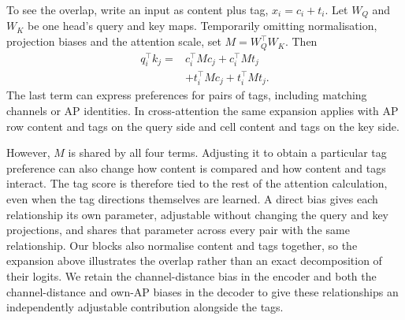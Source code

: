 \documentclass[conference]{IEEEtran}
\begin{document}
To see the overlap, write an input as content plus tag, $x_i=c_i+t_i$.
Let $W_Q$ and $W_K$ be one head's query and key maps. Temporarily omitting
normalisation, projection biases and the attention scale, set
$M=W_Q^\top W_K$. Then
\begin{equation}
\begin{split}
 q_i^\top k_j ={}& c_i^\top M c_j + c_i^\top M t_j \\
                 &+ t_i^\top M c_j + t_i^\top M t_j.
\end{split}
\label{eq:tag_attention}
\end{equation}
The last term can express preferences for pairs of tags, including matching
channels or AP identities. In cross-attention the same expansion applies with
AP row content and tags on the query side and cell content and tags on the
key side.

However, $M$ is shared by all four terms. Adjusting it to obtain a particular
tag preference can also change how content is compared and how content and
tags interact. The tag score is therefore tied to the rest of the attention
calculation, even when the tag directions themselves are learned. A direct
bias gives each relationship its own parameter,
adjustable without changing the query and key projections, and shares that
parameter across every pair with the same relationship. Our blocks also
normalise content and tags together, so the expansion above illustrates the
overlap rather than an exact decomposition of their logits. We retain the
channel-distance bias in the encoder and both the channel-distance and own-AP
biases in the decoder to give these relationships an independently adjustable
contribution alongside the tags.
\end{document}
